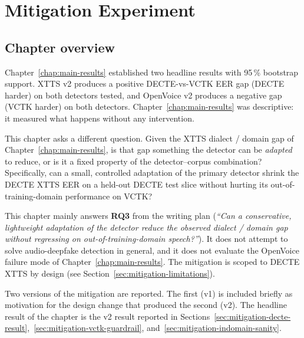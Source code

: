 \cleardoubleoddpage
\chapter{Mitigation Experiment}
\label{chap:mitigation}



\section{Chapter overview}
\label{sec:mitigation-overview}

Chapter~\ref{chap:main-results} established two headline results with 95\,\% bootstrap
support. XTTS v2 produces a positive DECTE-vs-VCTK EER gap (DECTE
harder) on both detectors tested, and OpenVoice v2 produces a
negative gap (VCTK harder) on both detectors. Chapter~\ref{chap:main-results} was
descriptive: it measured what happens without any intervention.

This chapter asks a different question. Given the XTTS
dialect / domain gap of Chapter~\ref{chap:main-results}, is that gap something the
detector can be \emph{adapted} to reduce, or is it a fixed property of
the detector--corpus combination? Specifically, can a small,
controlled adaptation of the primary detector shrink the DECTE
XTTS EER on a held-out DECTE test slice without hurting its
out-of-training-domain performance on VCTK?

This chapter mainly answers \textbf{RQ3} from the writing plan
(\emph{``Can a conservative, lightweight adaptation of the detector
reduce the observed dialect / domain gap without regressing on
out-of-training-domain speech?''}). It does not attempt to solve
audio-deepfake detection in general, and it does not evaluate
the OpenVoice failure mode of Chapter~\ref{chap:main-results}. The mitigation is
scoped to DECTE XTTS by design (see Section~\ref{sec:mitigation-limitations}).

Two versions of the mitigation are reported. The first (v1) is
included briefly as motivation for the design change that
produced the second (v2). The headline result of the chapter is
the v2 result reported in Sections~\ref{sec:mitigation-decte-result},~\ref{sec:mitigation-vctk-guardrail}, and~\ref{sec:mitigation-indomain-sanity}.


